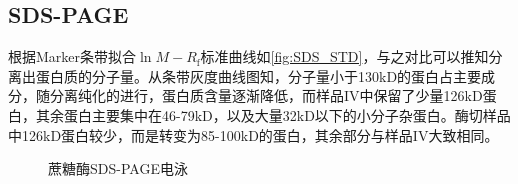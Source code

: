 \newpage
\subsection{SDS-PAGE}
\par 根据Marker条带拟合$\ln M - R_\text{f}$标准曲线如\ref{fig:SDS_STD}，与之对比可以推知分离出蛋白质的分子量。从条带灰度曲线图知，分子量小于130kD的蛋白占主要成分，随分离纯化的进行，蛋白质含量逐渐降低，而样品$\mathrm{IV}$中保留了少量126kD蛋白，其余蛋白主要集中在46-79kD，以及大量32kD以下的小分子杂蛋白。酶切样品中126kD蛋白较少，而是转变为85-100kD的蛋白，其余部分与样品$\mathrm{IV}$大致相同。

\begin{figure}[H]
    \caption{蔗糖酶SDS-PAGE电泳}
    \label{fig:SDS-PAGE}
\end{figure}

